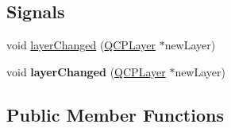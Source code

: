 \subsection*{Signals}
\begin{DoxyCompactItemize}
\item 
void \hyperlink{class_q_c_p_layerable_abbf8657cedea73ac1c3499b521c90eba}{layer\+Changed} (\hyperlink{class_q_c_p_layer}{Q\+C\+P\+Layer} $\ast$new\+Layer)
\item 
void {\bfseries layer\+Changed} (\hyperlink{class_q_c_p_layer}{Q\+C\+P\+Layer} $\ast$new\+Layer)\hypertarget{class_q_c_p_layerable_abbf8657cedea73ac1c3499b521c90eba}{}\label{class_q_c_p_layerable_abbf8657cedea73ac1c3499b521c90eba}

\end{DoxyCompactItemize}
\subsection*{Public Member Functions}
